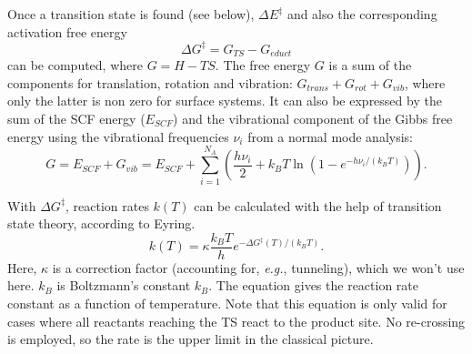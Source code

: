 \documentclass[11pt,DIV=13,BCOR=5mm,a4paper,headinclude]{scrbook}
\begin{document}
Once a transition state is found (see below), $\Delta E^\ddagger$ and also the corresponding activation free energy
\begin{equation}
\Delta G^\ddagger = G_{TS} - G_{educt}
\end{equation}
can be computed, where $G=H-TS$.
The free energy $G$ is a sum of the components for translation, rotation and vibration: $G_{trans}+G_{rot}+G_{vib}$, where only the latter is non zero for surface systems.
It can also be expressed by the sum of the SCF energy ($E_{SCF}$) and the vibrational component of the Gibbs free energy using the vibrational frequencies $\nu_i$ from a normal mode analysis:
\begin{equation}
G=E_{SCF} + G_{vib}=E_{SCF}+ \sum_{i=1}^{N_A}(\frac{h\nu_i}{2} + k_BT\ln(1-e^{-h\nu_i/(k_BT)})).
\end{equation}

With $\Delta G^\ddagger$, reaction rates $k(T)$ can be calculated with the help of transition state theory, according to Eyring\cite{eyring,eyring-polanyi}.
\begin{equation}\label{eq:eyring}
k(T)=\kappa\frac{k_BT}{h}e^{-\Delta G^\ddagger(T)/(k_BT)}.
\end{equation}
Here, $\kappa$ is a correction factor (accounting for, \textit{e.g.}, tunneling), which we won't use here. $k_B$ is Boltzmann's constant $k_B$.
The equation gives the reaction rate constant as a function of temperature.
Note that this equation is only valid for cases where all reactants reaching the TS react to the product site.
No re-crossing is employed, so the rate is the upper limit in the classical picture.
\\\\
\end{document}
